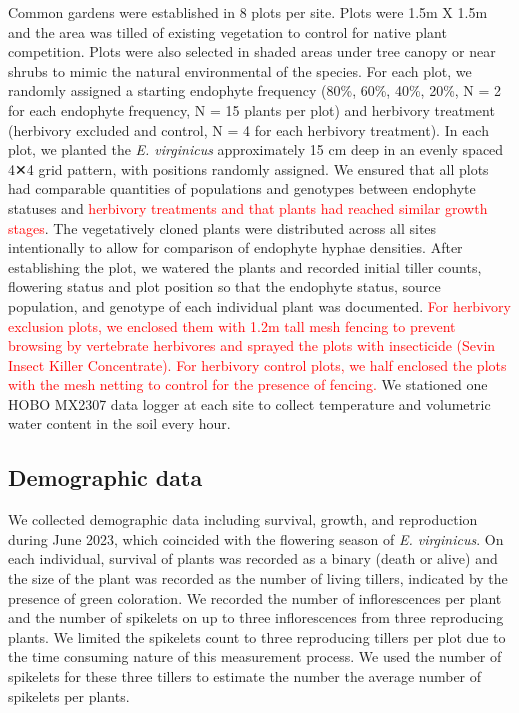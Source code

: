 \documentclass[12pt,english]{article}
\begin{document}
\begin{spacing}{1.9}
Common gardens were established in 8 plots per site. 
Plots were 1.5m X 1.5m and the area was tilled of existing vegetation to control for native plant competition.
Plots were also selected in shaded areas under tree canopy or near shrubs to mimic the natural environmental of the species.
For each plot, we randomly assigned a starting endophyte frequency (80\%, 60\%, 40\%, 20\%, N = 2 for each endophyte frequency, N = 15 plants per plot) and herbivory treatment (herbivory excluded and control, N = 4 for each herbivory treatment). 
In each plot, we planted the \emph{E. virginicus} approximately 15 cm deep in an evenly spaced 4✕4 grid pattern, with positions randomly assigned. 
We ensured that all plots had comparable quantities of populations and genotypes between endophyte statuses and  \textcolor{red} {herbivory treatments and that plants had reached similar growth stages}.
The vegetatively cloned plants were distributed across all sites intentionally to allow for comparison of endophyte hyphae densities. 
After establishing the plot, we watered the plants and recorded initial tiller counts, flowering status and plot position so that the endophyte status, source population, and genotype of each individual plant was documented. 
\textcolor{red} {For herbivory exclusion plots, we enclosed them with 1.2m tall mesh fencing to prevent browsing by vertebrate herbivores and sprayed the plots with insecticide (Sevin Insect Killer Concentrate). 
For herbivory control plots, we half enclosed the plots with the mesh netting to control for the presence of fencing.}
We stationed one HOBO MX2307 data logger at each site to collect temperature and volumetric water content in the soil every hour. 



\subsection*{Demographic data}
We collected demographic data including survival, growth, and reproduction during June 2023, which coincided with the flowering season of \emph{E. virginicus}. 
On each individual, survival of plants was recorded as a binary (death or alive) and the size of the plant was recorded as the number of living tillers, indicated by the presence of green coloration. 
We recorded the number of inflorescences per plant and the number of spikelets on up to three inflorescences from three reproducing plants.
We limited the spikelets count to three reproducing tillers per plot due to the time consuming nature of this measurement process. 
We used the number of spikelets for these three tillers to estimate the number the average number of spikelets per plants.



\end{spacing}
\end{document}
